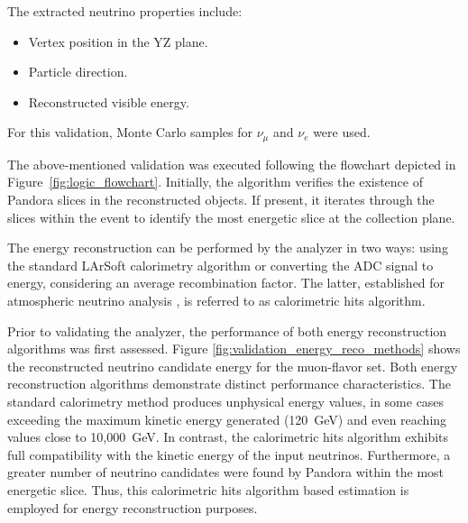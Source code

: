 
The extracted neutrino properties include:
\begin{itemize}
    \item Vertex position in the YZ plane.
    \item Particle direction.
    \item Reconstructed visible energy.
\end{itemize}
For this validation, Monte Carlo samples for $\nu_\mu$ and $\nu_e$ were used.

The above-mentioned validation was executed following the flowchart depicted in Figure~\ref{fig:logic_flowchart}. Initially, the algorithm verifies the existence of Pandora slices in the reconstructed objects. If present, it iterates through the slices within the event to identify the most energetic slice at the collection plane. 

The energy reconstruction can be performed by the analyzer in two ways: using the standard LArSoft calorimetry algorithm or converting the ADC signal to energy, considering an average recombination factor. The latter, established for atmospheric neutrino analysis \cite{atmospherics}, is referred to as calorimetric hits algorithm.

Prior to validating the analyzer, the performance of both energy reconstruction algorithms was first assessed. Figure \ref{fig:validation_energy_reco_methods} shows the reconstructed neutrino candidate energy for the muon-flavor set. Both energy reconstruction algorithms demonstrate distinct performance characteristics. The standard calorimetry method produces unphysical energy values, in some cases exceeding the maximum kinetic energy generated (120~GeV) and even reaching values close to 10,000~GeV. In contrast, the calorimetric hits algorithm exhibits full compatibility with the kinetic energy of the input neutrinos. Furthermore, a greater number of neutrino candidates were found by Pandora within the most energetic slice. Thus, this calorimetric hits algorithm based estimation is employed for energy reconstruction purposes.

